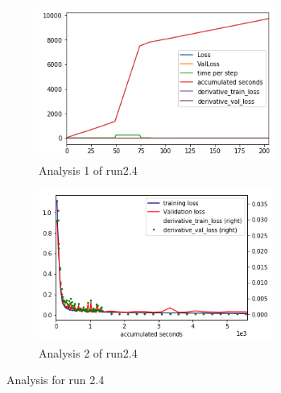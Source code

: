 \documentclass[paper=a4, fontsize=11pt]{scrartcl} %
\numberwithin{equation}{section} %
\numberwithin{figure}{section} %
\numberwithin{table}{section} %
\begin{document}
\begin{figure}	
	\begin{subfigure}{0.45\textwidth}
	\includegraphics[width=0.9\linewidth, height=5cm]{./imgs/analysis_0_2_4.png} 
	\caption{Analysis 1 of run2.4}
	\label{fig:subAnalysisRun24}
	\end{subfigure}
	\begin{subfigure}{0.45\textwidth}
	\includegraphics[width=0.9\linewidth, height=5cm]{./imgs/analysis_0_2_4plot.png}
	\caption{Analysis 2 of run2.4}
	\label{fig:subAnalysisRun24plot}
	\end{subfigure}
	 
	\caption{Analysis for run 2.4}
	\label{fig:AnalysisRun24}
 \end{figure}
 
\end{document}
